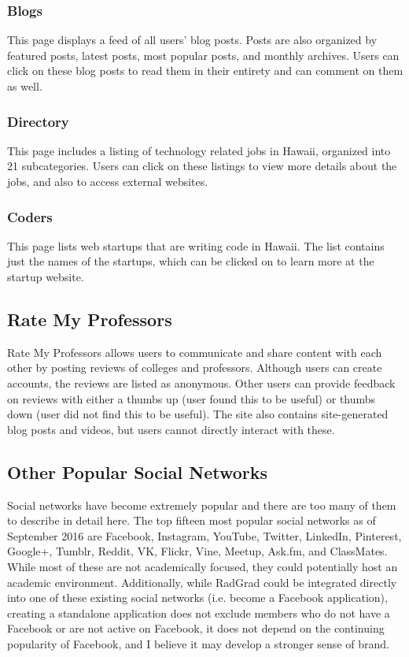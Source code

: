 \subsubsection{Blogs}
This page displays a feed of all users' blog posts. Posts are also organized by featured posts, latest posts, most popular posts, and monthly archives. Users can click on these blog posts to read them in their entirety and can comment on them as well. 
\subsubsection{Directory}
This page includes a listing of technology related jobs in Hawaii, organized into 21 subcategories. Users can click on these listings to view more details about the jobs, and also to access external websites.
\subsubsection{Coders}
This page lists web startups that are writing code in Hawaii. The list contains just the names of the startups, which can be clicked on to learn more at the startup website.

\subsection{Rate My Professors}
Rate My Professors allows users to communicate and share content with each other by posting reviews of colleges and professors. Although users can create accounts, the reviews are listed as anonymous. Other users can provide feedback on reviews with either a thumbs up (user found this to be useful) or thumbs down (user did not find this to be useful). The site also contains site-generated blog posts and videos, but users cannot directly interact with these.

\subsection{Other Popular Social Networks}
Social networks have become extremely popular and there are too many of them to describe in detail here. The top fifteen most popular social networks as of September 2016 are Facebook, Instagram, YouTube, Twitter, LinkedIn, Pinterest, Google+, Tumblr, Reddit, VK, Flickr, Vine, Meetup, Ask.fm, and ClassMates. While most of these are not academically focused, they could potentially host an academic environment. Additionally, while RadGrad could be integrated directly into one of these existing social networks (i.e. become a Facebook application), creating a standalone application does not exclude members who do not have a Facebook or are not active on Facebook, it does not depend on the continuing popularity of Facebook, and I believe it may develop a stronger sense of brand. 

